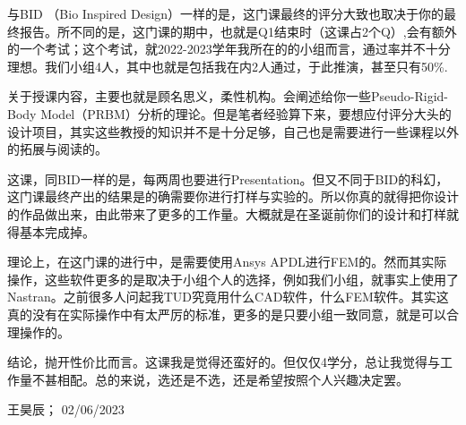 与BID （Bio Inspired Design）一样的是，这门课最终的评分大致也取决于你的最终报告。所不同的是，这门课的期中，也就是Q1结束时（这课占2个Q）,会有额外的一个考试；这个考试，就2022-2023学年我所在的的小组而言，通过率并不十分理想。我们小组4人，其中也就是包括我在内2人通过，于此推演，甚至只有50\%.

关于授课内容，主要也就是顾名思义，柔性机构。会阐述给你一些Pseudo-Rigid-Body Model（PRBM）分析的理论。但是笔者经验算下来，要想应付评分大头的设计项目，其实这些教授的知识并不是十分足够，自己也是需要进行一些课程以外的拓展与阅读的。

这课，同BID一样的是，每两周也要进行Presentation。但又不同于BID的科幻，这门课最终产出的结果是的确需要你进行打样与实验的。所以你真的就得把你设计的作品做出来，由此带来了更多的工作量。大概就是在圣诞前你们的设计和打样就得基本完成掉。

理论上，在这门课的进行中，是需要使用Ansys APDL进行FEM的。然而其实际操作，这些软件更多的是取决于小组个人的选择，例如我们小组，就事实上使用了Nastran。之前很多人问起我TUD究竟用什么CAD软件，什么FEM软件。其实这真的没有在实际操作中有太严厉的标准，更多的是只要小组一致同意，就是可以合理操作的。

结论，抛开性价比而言。这课我是觉得还蛮好的。但仅仅4学分，总让我觉得与工作量不甚相配。总的来说，选还是不选，还是希望按照个人兴趣决定罢。
\begin{flushright}
王昊辰； 02/06/2023
\end{flushright}

